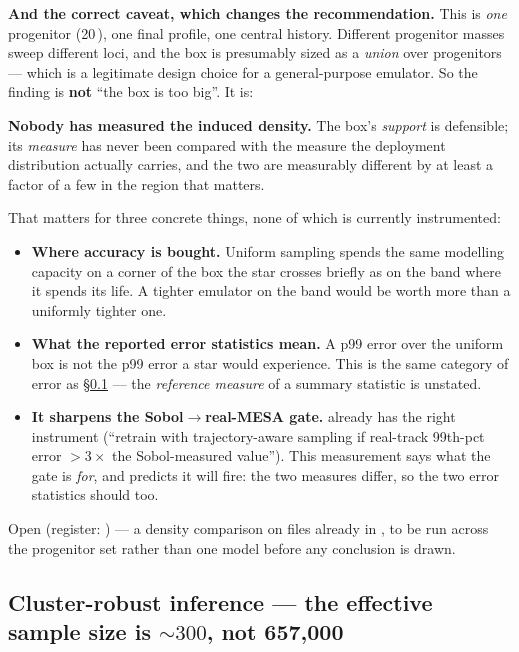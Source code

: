 \begin{warn}
\textbf{And the correct caveat, which changes the recommendation.} This is
\emph{one} progenitor (20\,\Msun), one final profile, one central history.
Different progenitor masses sweep different loci, and the box is presumably
sized as a \emph{union} over progenitors --- which is a legitimate design choice
for a general-purpose emulator. So the finding is \textbf{not} ``the box is too
big''. It is:

\textbf{Nobody has measured the induced density.} The box's \emph{support} is
defensible; its \emph{measure} has never been compared with the measure the
deployment distribution actually carries, and the two are measurably different
by at least a factor of a few in the region that matters.
\end{warn}

That matters for three concrete things, none of which is currently instrumented:

\begin{itemize}
\item \textbf{Where accuracy is bought.} Uniform sampling spends the same
  modelling capacity on a corner of the box the star crosses briefly as on the
  band where it spends its life. A tighter emulator on the band would be worth
  more than a uniformly tighter one.
\item \textbf{What the reported error statistics mean.} A p99 error over the
  uniform box is not the p99 error a star would experience. This is the same
  category of error as \S\ref{sec:clusterrobust} --- the \emph{reference
  measure} of a summary statistic is unstated.
\item \textbf{It sharpens the Sobol$\to$real-MESA gate.} 
  already has the right instrument (``retrain with trajectory-aware sampling if
  real-track 99th-pct \Ye{} error $> 3\times$ the Sobol-measured value''). This
  measurement says what the gate is \emph{for}, and predicts it will fire: the
  two measures differ, so the two error statistics should too.
\end{itemize}

Open (register: ) --- a density comparison on files already in
, to be run across the progenitor set rather than one model
before any conclusion is drawn.

\subsection{Cluster-robust inference --- the effective sample size is
            \texorpdfstring{${\sim}300$}{~300}, not 657,000}
\label{sec:clusterrobust}

